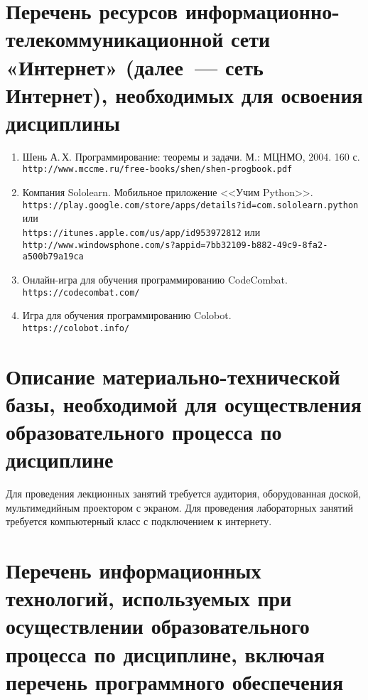 \documentclass[a4paper,12pt]{article}
\begin{document}
\section{Перечень ресурсов информационно-телекоммуникационной сети «Интернет» (далее~--- сеть Интернет), необходимых для освоения дисциплины}
\begin{enumerate}
  
  \item Шень А.\,Х. Программирование: теоремы и задачи. М.: МЦНМО, 2004. 160 с. \\\texttt{http://www.mccme.ru/free-books/shen/shen-progbook.pdf} 
  
  \item Компания Sololearn. Мобильное приложение <<Учим Python>>. \\\texttt{https://play.google.com/store/apps/details?id=com.sololearn.python} или \\\texttt{https://itunes.apple.com/us/app/id953972812} или \\\texttt{http://www.windowsphone.com/s?appid=7bb32109-b882-49c9-8fa2-a500b79a19ca} 
  
  \item Онлайн-игра для обучения программированию CodeCombat. \\\texttt{https://codecombat.com/} 
  
  \item Игра для обучения программированию Colobot. \\\texttt{https://colobot.info/} 
  
\end{enumerate}


\newpage
\section{Описание материально-технической базы, необходимой для осуществления образовательного процесса по дисциплине}
  
  
       Для проведения лекционных занятий требуется аудитория, оборудованная доской,  мультимедийным проектором с экраном. 
       Для проведения лабораторных занятий требуется компьютерный класс с подключением к интернету.
  
  


\section{Перечень информационных технологий, используемых при осуществлении образовательного процесса по дисциплине, включая перечень программного обеспечения
}
\end{document}
